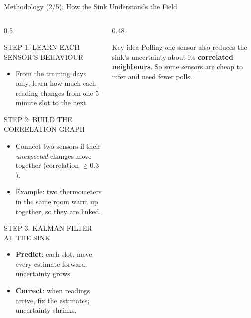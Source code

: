 \documentclass[aspectratio=169,10pt,xcolor=table]{beamer}
\newcommand{\sect}[1]{\par{\color{muted}\scriptsize\MakeUppercase{#1}}\par\vspace{0.2em}}
\begin{document}
\begin{frame}{Methodology (2/5): How the Sink Understands the Field}
  \begin{columns}[T]
    \begin{column}{0.5\textwidth}
      \sect{Step 1: Learn each sensor's behaviour}
      \begin{itemize}\small
        \item From the training days only, learn how much each reading changes from one 5-minute slot to the next.
      \end{itemize}
      \sect{Step 2: Build the correlation graph}
      \begin{itemize}\small
        \item Connect two sensors if their \emph{unexpected} changes move together (correlation $\ge 0.3$).
        \item Example: two thermometers in the same room warm up together, so they are linked.
      \end{itemize}
      \sect{Step 3: Kalman filter at the sink}
      \begin{itemize}\small
        \item \textbf{Predict}: each slot, move every estimate forward; uncertainty grows.
        \item \textbf{Correct}: when readings arrive, fix the estimates; uncertainty shrinks.
      \end{itemize}
    \end{column}
    \begin{column}{0.48\textwidth}
      \begin{block}{Key idea}
        \small Polling one sensor also reduces the sink's uncertainty about its \textbf{correlated neighbours}.
        So some sensors are cheap to infer and need fewer polls.
      \end{block}
      \vspace{0.3em}
      \centering
\end{column}
\end{columns}
\end{frame}
\end{document}
